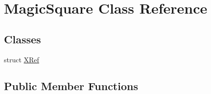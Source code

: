 \hypertarget{classMagicSquare}{
\section{MagicSquare Class Reference}
\label{classMagicSquare}
}
\subsection*{Classes}
\begin{DoxyCompactItemize}
\item 
struct \hyperlink{structMagicSquare_1_1XRef}{XRef}
\end{DoxyCompactItemize}
\subsection*{Public Member Functions}
